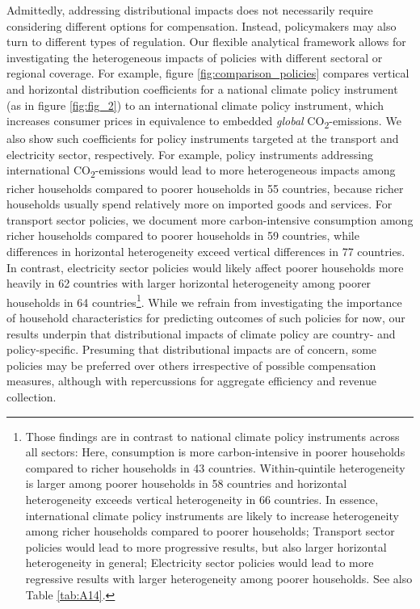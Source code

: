 \documentclass[12pt, a4paper]{article}
\begin{document}
Admittedly, addressing distributional impacts does not necessarily require considering different options for compensation. Instead, policymakers may also turn to different types of regulation. Our flexible analytical framework allows for investigating the heterogeneous impacts of policies with different sectoral or regional coverage. For example, figure \ref{fig:comparison_policies} compares vertical and horizontal distribution coefficients for a national climate policy instrument (as in figure \ref{fig:fig_2}) to an international climate policy instrument, which increases consumer prices in equivalence to embedded \textit{global} CO\textsubscript{2}-emissions. We also show such coefficients for policy instruments targeted at the transport and electricity sector, respectively. For example, policy instruments addressing international CO\textsubscript{2}-emissions  \autocite[such as border carbon adjustment, e.g][]{Mehling.2019,Cosbey.2019} would lead to more heterogeneous impacts among richer households compared to poorer households in 55 countries, because richer households usually spend relatively more on imported goods and services. For transport sector policies, we document more carbon-intensive consumption among richer households compared to poorer households in 59 countries, while differences in horizontal heterogeneity exceed vertical differences in 77 countries. In contrast, electricity sector policies would likely affect poorer households more heavily in 62 countries with larger horizontal heterogeneity among poorer households in 64 countries\footnote{Those findings are in contrast to national climate policy instruments across all sectors: Here, consumption is more carbon-intensive in poorer households compared to richer households in 43 countries. Within-quintile heterogeneity is larger among poorer households in 58 countries and horizontal heterogeneity exceeds vertical heterogeneity in 66 countries. In essence, international climate policy instruments are likely to increase heterogeneity among richer households compared to poorer households; Transport sector policies would lead to more progressive results, but also larger horizontal heterogeneity in general; Electricity sector policies would lead to more regressive results with larger heterogeneity among poorer households. See also Table \ref{tab:A14}.}. While we refrain from investigating the importance of household characteristics for predicting outcomes of such policies for now, our results underpin that distributional impacts of climate policy are country- and policy-specific. Presuming that distributional impacts are of concern, some policies may be preferred over others irrespective of possible compensation measures, although with repercussions for aggregate efficiency and revenue collection. 
\end{document}
